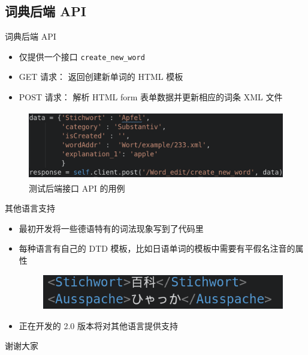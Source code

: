 \documentclass[notheorems,xetex]{beamer}
\begin{document}
\subsection{词典后端 API}
\begin{frame}{词典后端 API}
\begin{itemize}
	\item 仅提供一个接口 \texttt{create\_new\_word}
	\item GET 请求： 返回创建新单词的 HTML 模板
	\item POST 请求： 解析 HTML form 表单数据并更新相应的词条 XML 文件
\end{itemize}
\begin{figure}
	\includegraphics[height=3cm]{api.png}
	\caption{测试后端接口 API 的用例}
\end{figure}
\end{frame}
\begin{frame}{其他语言支持}
\begin{itemize}
	\item 最初开发将一些德语特有的词法现象写到了代码里
	\item 每种语言有自己的 DTD 模板，比如日语单词的模板中需要有平假名注音的属性
\begin{figure}
	\includegraphics[height=1.5cm]{pronounciation.png}
\end{figure}
	\item 正在开发的 2.0 版本将对其他语言提供支持
	
\end{itemize}
\end{frame}


\begin{frame}
\begin{block}{}
	\centering
	\Huge 谢谢大家

\end{block}
\end{frame}


\end{document}
